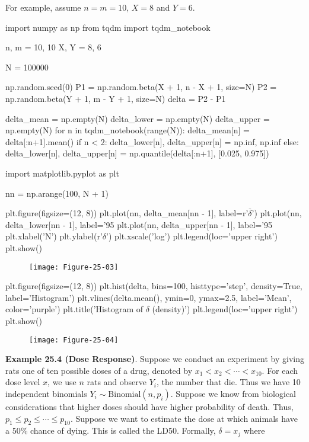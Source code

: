 For example, assume \(n = m = 10\), \(X = 8\) and \(Y = 6\).

\begin{python}
import numpy as np
from tqdm import tqdm_{n}otebook

n, m = 10, 10
X, Y = 8, 6

N = 100000

np.random.seed(0)
P1 = np.random.beta(X + 1, n - X + 1, size=N)
P2 = np.random.beta(Y + 1, m - Y + 1, size=N)
delta = P2 - P1

delta_mean = np.empty(N)
delta_lower = np.empty(N)
delta_upper = np.empty(N)
for n in tqdm_{n}otebook(range(N)):
    delta_mean[n] = delta[:n+1].mean()
    if n < 2:
        delta_lower[n], delta_upper[n] = np.inf, np.inf
    else:
        delta_lower[n], delta_upper[n] = np.quantile(delta[:n+1], [0.025, 0.975])
\end{python}

\begin{python}
import matplotlib.pyplot as plt

nn = np.arange(100, N + 1)

plt.figure(figsize=(12, 8))
plt.plot(nn, delta_mean[nn - 1], label=r'$\overline{\delta}$')
plt.plot(nn, delta_lower[nn - 1], label='95%
plt.plot(nn, delta_upper[nn - 1], label='95%
plt.xlabel('N')
plt.ylabel(r'$\delta$')
plt.xscale('log')
plt.legend(loc='upper right')
plt.show()
\end{python}

\begin{figure}[H]
\centering
\texttt{[image: Figure-25-03]}
\end{figure}

\begin{python}
plt.figure(figsize=(12, 8))
plt.hist(delta, bins=100, histtype='step', density=True, label='Histogram')
plt.vlines(delta.mean(), ymin=0, ymax=2.5, label='Mean', color='purple')
plt.title('Histogram of $\delta$ (density)')
plt.legend(loc='upper right')
plt.show()
\end{python}

\begin{figure}[H]
\centering
\texttt{[image: Figure-25-04]}
\end{figure}

\textbf{Example 25.4 (Dose Response)}. Suppose we conduct an experiment
by giving rats one of ten possible doses of a drug, denoted by
\(x_{1} < x_{2} < \cdots < x_{10}\). For each dose level \(x\), we use \(n\)
rats and observe \(Y_{i}\), the number that die. Thus we have 10
independent binomials \(Y_{i} \sim \text{Binomial}(n, p_{i})\). Suppose we
know from biological considerations that higher doses should have higher
probability of death. Thus, \(p_{1} \leq p_{2} \leq \cdots \leq p_{10}\).
Suppose we want to estimate the dose at which animals have a 50\% chance
of dying. This is called the LD50. Formally, \(\delta = x_{j}\) where

